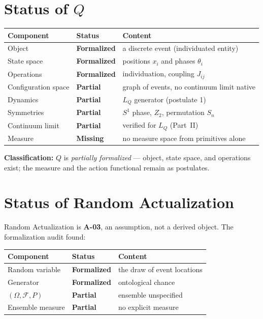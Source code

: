 \documentclass[10pt,twoside,openany]{book}
\begin{document}
\section{Status of $Q$}

\begin{center}
\begin{tabular}{lll}
\toprule
Component & Status & Content \\
\midrule
Object & \textbf{Formalized} & a discrete event (individuated entity) \\
State space & \textbf{Formalized} & positions $x_i$ and phases $\theta_i$ \\
Operations & \textbf{Formalized} & individuation, coupling $J_{ij}$ \\
Configuration space & \textbf{Partial} & graph of events, no continuum limit native \\
Dynamics & \textbf{Partial} & $L_Q$ generator (postulate 1) \\
Symmetries & \textbf{Partial} & $S^1$ phase, $Z_2$, permutation $S_n$ \\
Continuum limit & \textbf{Partial} & verified for $L_Q$ (Part~II) \\
Measure & \textbf{Missing} & no measure space from primitives alone \\
\bottomrule
\end{tabular}
\end{center}

\textbf{Classification:} $Q$ is \emph{partially formalized} — object, state space, and
operations exist; the measure and the action functional remain as postulates.

\section{Status of Random Actualization}

Random Actualization is \textbf{A-03}, an assumption, not a derived object. The
formalization audit found:

\begin{center}
\begin{tabular}{lll}
\toprule
Component & Status & Content \\
\midrule
Random variable & \textbf{Formalized} & the draw of event locations \\
Generator & \textbf{Formalized} & ontological chance \\
$(\Omega,\mathcal F,P)$ & \textbf{Partial} & ensemble unspecified \\
Ensemble measure & \textbf{Partial} & no explicit measure \\
\bottomrule
\end{tabular}
\end{center}
\end{document}
